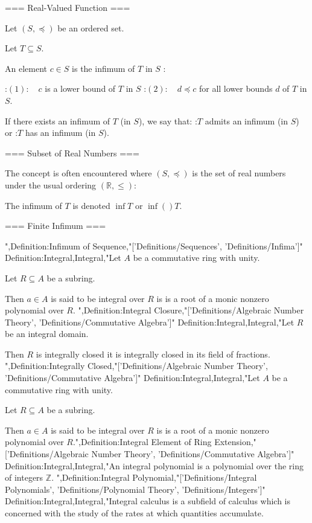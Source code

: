 === Real-Valued Function ===

Let $\left( S, \preccurlyeq \right)$ be an ordered set.

Let $T \subseteq S$.


An element $c \in S$ is the infimum of $T$ in $S$ :

:$(1): \quad c$ is a lower bound of $T$ in $S$
:$(2): \quad d \preccurlyeq c$ for all lower bounds $d$ of $T$ in $S$.


If there exists an infimum of $T$ (in $S$), we say that:
:$T$ admits an infimum (in $S$) or
:$T$ has an infimum (in $S$).


=== Subset of Real Numbers ===

The concept is often encountered where $\left( S, \preccurlyeq \right)$ is the set of real numbers under the usual ordering $\left( \mathbb R, \le \right)$:



The infimum of $T$ is denoted $\inf T$ or $\inf \left(   \right)T$.


=== Finite Infimum ===

",Definition:Infimum of Sequence,"['Definitions/Sequences', 'Definitions/Infima']"
Definition:Integral,Integral,"Let $A$ be a commutative ring with unity.

Let $R \subseteq A$ be a subring.


Then $a \in A$ is said to be integral over $R$  is is a root of a monic nonzero polynomial over $R$.
",Definition:Integral Closure,"['Definitions/Algebraic Number Theory', 'Definitions/Commutative Algebra']"
Definition:Integral,Integral,"Let $R$ be an integral domain.


Then $R$ is integrally closed  it is integrally closed in its field of fractions.
",Definition:Integrally Closed,"['Definitions/Algebraic Number Theory', 'Definitions/Commutative Algebra']"
Definition:Integral,Integral,"Let $A$ be a commutative ring with unity.

Let $R \subseteq A$ be a subring.


Then $a \in A$ is said to be integral over $R$  is is a root of a monic nonzero polynomial over $R$.",Definition:Integral Element of Ring Extension,"['Definitions/Algebraic Number Theory', 'Definitions/Commutative Algebra']"
Definition:Integral,Integral,"An integral polynomial is a polynomial over the ring of integers $\mathbb Z$.
",Definition:Integral Polynomial,"['Definitions/Integral Polynomials', 'Definitions/Polynomial Theory', 'Definitions/Integers']"
Definition:Integral,Integral,"Integral calculus is a subfield of calculus which is concerned with the study of the rates at which quantities accumulate.


